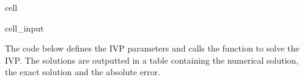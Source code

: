 \documentclass[letterpaper,10pt,english]{jupyterBook}
\begin{document}
\begin{sphinxuseclass}{cell}\begin{sphinxVerbatimInput}

\begin{sphinxuseclass}{cell_input}
\begin{sphinxVerbatim}[commandchars=\\\{\}]
  
       


 
         
\end{sphinxVerbatim}

\end{sphinxuseclass}\end{sphinxVerbatimInput}

\end{sphinxuseclass}
\sphinxAtStartPar
The code below defines the IVP parameters and calls the  function to solve the IVP. The solutions are outputted in a table containing the numerical solution, the exact solution and the absolute error.
\end{document}
